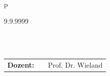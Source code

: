\begin{center}
\begin{tabular}{p{\textwidth}}
\begin{center}
\large{9.9.9999}
\end{center}

\\

\\

\begin{center}
\begin{tabular}{lll}
\textbf{Dozent:} & & Prof. Dr. Wieland\\
\end{tabular}
\end{center}

\end{tabular}
\end{center}
